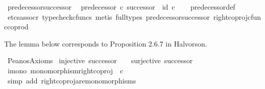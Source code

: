 \begin{isabellebody}
\endisatagproof
{\isafoldproof}%
%
\isadelimproof
\isanewline
%
\endisadelimproof
\isanewline
{}\isamarkupfalse%
\ predecessor{\isacharunderscore}{\kern0pt}successor{\isacharcolon}{\kern0pt}\isanewline
\ \ {\isachardoublequoteopen}predecessor\ {\isasymcirc}\isactrlsub c\ successor\ {\isacharequal}{\kern0pt}\ id\ {\isasymnat}\isactrlsub c{\isachardoublequoteclose}\isanewline
%
\isadelimproof
\ \ %
\endisadelimproof
%
\isatagproof
{}\isamarkupfalse%
\ predecessor{\isacharunderscore}{\kern0pt}def\isanewline
\ \ \isamarkupfalse%
\ {\isacharparenleft}{\kern0pt}etcs{\isacharunderscore}{\kern0pt}assocr{\isacharcomma}{\kern0pt}\ typecheck{\isacharunderscore}{\kern0pt}cfuncs{\isacharcomma}{\kern0pt}\ metis\ {\isacharparenleft}{\kern0pt}full{\isacharunderscore}{\kern0pt}types{\isacharparenright}{\kern0pt}\ predecessor{\isacharprime}{\kern0pt}{\isacharunderscore}{\kern0pt}successor\ right{\isacharunderscore}{\kern0pt}coproj{\isacharunderscore}{\kern0pt}cfunc{\isacharunderscore}{\kern0pt}coprod{\isacharparenright}{\kern0pt}%
\endisatagproof
{\isafoldproof}%
%
\isadelimproof
%
\endisadelimproof
%
\isadelimdocument
%
\endisadelimdocument
%
\isatagdocument
%
\isamarkuptrue%
%
\endisatagdocument
{\isafolddocument}%
%
\isadelimdocument
%
\endisadelimdocument
%
\begin{isamarkuptext}%
The lemma below corresponds to Proposition 2.6.7 in Halvorson.%
\end{isamarkuptext}\isamarkuptrue%
\isamarkupfalse%
\ Peano{\isacharprime}{\kern0pt}s{\isacharunderscore}{\kern0pt}Axioms{\isacharcolon}{\kern0pt}\isanewline
\ {\isachardoublequoteopen}injective\ successor\ \ {\isasymand}\ {\isasymnot}\ surjective\ successor{\isachardoublequoteclose}\isanewline
%
\isadelimproof
%
\endisadelimproof
%
\isatagproof
{}\isamarkupfalse%
\ {\isacharminus}{\kern0pt}\ \isanewline
\ \ \isamarkupfalse%
\ i{}{\isacharunderscore}{\kern0pt}mono{\isacharcolon}{\kern0pt}\ {\isachardoublequoteopen}monomorphism{\isacharparenleft}{\kern0pt}right{\isacharunderscore}{\kern0pt}coproj\ {\isasymone}\ {\isasymnat}\isactrlsub c{\isacharparenright}{\kern0pt}{\isachardoublequoteclose}\isanewline
\ \ \ \ \isamarkupfalse%
\ {\isacharparenleft}{\kern0pt}simp\ add{\isacharcolon}{\kern0pt}\ right{\isacharunderscore}{\kern0pt}coproj{\isacharunderscore}{\kern0pt}are{\isacharunderscore}{\kern0pt}monomorphisms{\isacharparenright}{\kern0pt}\isanewline
\ \ \isamarkupfalse%

\end{isabellebody}
